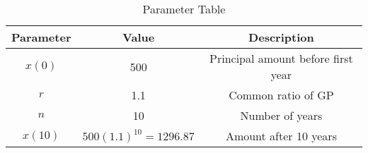 \begin{table}[ht]
	  \centering
	    \begin{tabular}{|c|c|c|}
		        \hline
			   \textbf{ Parameter} & \textbf{Value} & \textbf{Description} \\
			       \hline
			           $x(0)$ & 500 & Principal amount before first year \\
				       \hline
				           $r$ & 1.1 & Common ratio of GP \\
					       \hline
					           $n$ & 10 & Number of years   \\
						       \hline
						           $x(10)$ & $500(1.1)^{10} = 1296.87$ & Amount after 10 years  \\
							       \hline
							         \end{tabular}
								   \vspace{2mm}
								     \caption{Parameter Table}
								       \label{tab:11.9.3.31}
\end{table}
